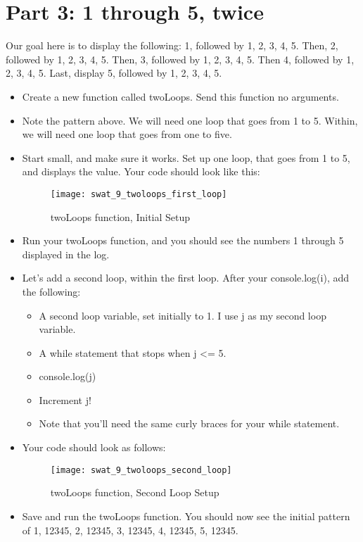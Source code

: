 \documentclass{article}
\begin{document}
\section*{Part 3: 1 through 5, twice}
Our goal here is to display the following:  1, followed by 1, 2, 3, 4, 5.  Then, 2, followed by 1, 2, 3, 4, 5.  Then, 3, followed by 1, 2, 3, 4, 5.  Then 4, followed by 1, 2, 3, 4, 5.  Last, display 5, followed by 1, 2, 3, 4, 5.
\begin{itemize}
    \item Create a new function called twoLoops.  Send this function no arguments.
 	\item Note the pattern above.  We will need one loop that goes from 1 to 5.  Within, we will need one loop that goes from one to five.
 	\item Start small, and make sure it works.  Set up one loop, that goes from 1 to 5, and displays the value.  Your code should look like this:
 	\begin{figure}[H]
  		\centering
  		\texttt{[image: swat\_9\_twoloops\_first\_loop]}
  		\caption{twoLoops function, Initial Setup}
	\end{figure}
	\item Run your twoLoops function, and you should see the numbers 1 through 5 displayed in the log.
	\item Let's add a second loop, within the first loop.  After your console.log(i), add the following:
	\begin{itemize}
		\item A second loop variable, set initially to 1.  I use j as my second loop variable.
		\item A while statement that stops when j <= 5.
		\item console.log(j)
		\item Increment j!
		\item Note that you'll need the same curly braces for your while statement.
	\end{itemize}
	\item Your code should look as follows:
	\begin{figure}[H]
  		\centering
  		\texttt{[image: swat\_9\_twoloops\_second\_loop]}
  		\caption{twoLoops function, Second Loop Setup}
	\end{figure}
	\item Save and run the twoLoops function.  You should now see the initial pattern of 1, 12345, 2, 12345, 3, 12345, 4, 12345, 5, 12345.
\end{itemize}
\end{document}
